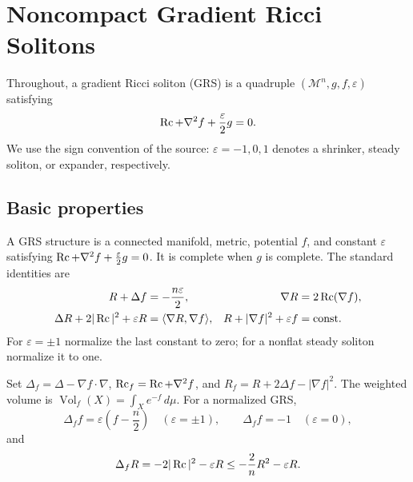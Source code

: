 \chapter[27]{Noncompact Gradient Ricci Solitons}
\label{ch:chow-iv-noncompact-gradient-ricci-solitons}

Throughout, a gradient Ricci soliton (GRS) is a quadruple
$(\mathcal M^n,g,f,\varepsilon)$ satisfying
\[
\operatorname{Rc}+\nabla^2f+\frac{\varepsilon}{2}g=0.
\]
We use the sign convention of the source: $\varepsilon=-1,0,1$ denotes a
shrinker, steady soliton, or expander, respectively.

\section{Basic properties}

\begin{definition}
\label{def:chow-iv-grs-structure}

A GRS structure is a connected manifold, metric, potential $f$, and constant
$\varepsilon$ satisfying $\operatorname{Rc}+\nabla^2f+\frac{\varepsilon}{2}g=0$.  It is complete
when $g$ is complete.  The standard identities are
\begin{align*}
R+\Delta f&=-\frac{n\varepsilon}{2},&
\nabla R&=2\operatorname{Rc}(\nabla f),\\
\Delta R+2|\operatorname{Rc}|^2+\varepsilon R&=\langle\nabla R,\nabla f\rangle,&
R+|\nabla f|^2+\varepsilon f&=\mathrm{const}.
\end{align*}
For $\varepsilon=\pm1$ normalize the last constant to zero; for a nonflat
steady soliton normalize it to one.
\end{definition}

\begin{definition}
\label{def:chow-iv-weighted-operators}

Set $\Delta_f=\Delta-\nabla f\cdot\nabla$, $\operatorname{Rc}_f=\operatorname{Rc}+\nabla^2f$, and
$R_f=R+2\Delta f-|\nabla f|^2$.  The weighted volume is
$\operatorname{Vol}_f(X)=\int_Xe^{-f}\,d\mu$.  For a normalized GRS,
\[
\Delta_f f=\varepsilon\left(f-\frac n2\right)\quad(\varepsilon=\pm1),
\qquad \Delta_f f=-1\quad(\varepsilon=0),
\]
and
\[
\Delta_fR=-2|\operatorname{Rc}|^2-\varepsilon R\le -\frac2nR^2-\varepsilon R.
\]
\end{definition}

